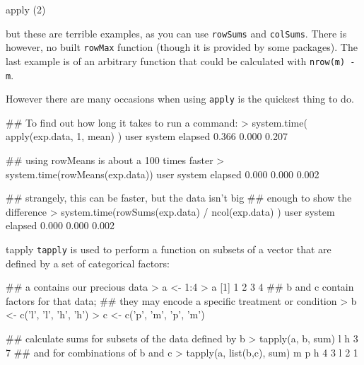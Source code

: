 \documentclass[pdf]{beamer}
\begin{document}
\begin{frame}[fragile]{apply (2)}

  {\small
  but these are terrible examples, as you can use \texttt{rowSums} and
  \texttt{colSums}. There is however, no built \texttt{rowMax} function 
  (though it is provided by some packages). The last example is of an
  arbitrary function that could be calculated with \texttt{nrow(m) - m}.
  
  However there are many occasions when using \texttt{apply} is the quickest
  thing to do.
}

  \begin{rcode}
    ## To find out how long it takes to run a command:
    > system.time( apply(exp.data, 1, mean) )
    user  system elapsed 
    0.366   0.000   0.207 

    ## using rowMeans is about a 100 times faster
    > system.time(rowMeans(exp.data))
    user  system elapsed 
    0.000   0.000   0.002 

    ## strangely, this can be faster, but the data isn't big
    ## enough to show the difference
    > system.time(rowSums(exp.data) / ncol(exp.data) )
    user  system elapsed 
    0.000   0.000   0.002 
  \end{rcode}

\end{frame}

\begin{frame}[fragile]{tapply}
  \verb|tapply| is used to perform a function on subsets of a vector that are
  defined by a set of categorical factors:
  
  \begin{rcode}
    ## a contains our precious data
    > a <- 1:4                     
    > a
    [1] 1 2 3 4
    ## b and c contain factors for that data;
    ## they may encode a specific treatment or condition
    > b <- c('l', 'l', 'h', 'h')                                                                                           
    > c <- c('p', 'm', 'p', 'm')                                                                                           
    
    ## calculate sums for subsets of the data defined by b
    > tapply(a, b, sum)                                                                                                    
    l h                                                                                                                    
    3 7                                                     
    ## and for combinations of b and c
    > tapply(a, list(b,c), sum)        
      m p                                                                                                                  
    h 4 3                                                                                                                  
    l 2 1                                                                                    
  \end{rcode}
\end{frame}
\end{document}

